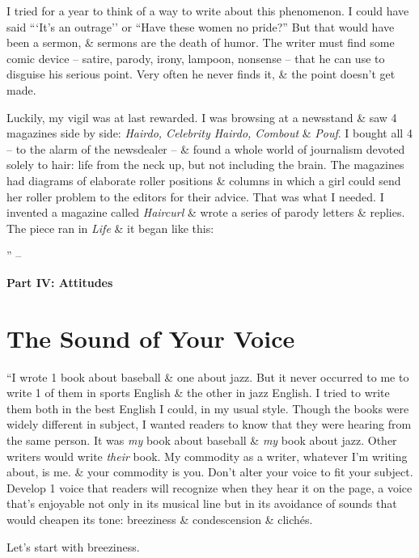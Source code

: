 \documentclass{article}
\numberwithin{equation}{section}
\begin{document}
I tried for a year to think of a way to write about this phenomenon. I could have said ```It's an outrage'' or ``Have these women no pride?'' But that would have been a sermon, \& sermons are the death of humor. The writer must find some comic device -- satire, parody, irony, lampoon, nonsense -- that he can use to disguise his serious point. Very often he never finds it, \& the point doesn't get made.

Luckily, my vigil was at last rewarded. I was browsing at a newsstand \& saw 4 magazines side by side: \textit{Hairdo, Celebrity Hairdo, Combout} \& \textit{Pouf}. I bought all 4 -- to the alarm of the newsdealer -- \& found a whole world of journalism devoted solely to hair: life from the neck up, but not including the brain. The magazines had diagrams of elaborate roller positions \& columns in which a girl could send her roller problem to the editors for their advice. That was what I needed. I invented a magazine called \textit{Haircurl} \& wrote a series of parody letters \& replies. The piece ran in \textit{Life} \& it began like this:

'' -- \cite[pp. 195--]{Zinsser2016}


\begin{center}\LARGE\sf
	\textbf{Part IV: Attitudes}
\end{center}

\section{The Sound of Your Voice}
``I wrote 1 book about baseball \& one about jazz. But it never occurred to me to write 1 of them in sports English \& the other in jazz English. I tried to write them both in the best English I could, in my usual style. Though the books were widely different in subject, I wanted readers to know that they were hearing from the same person. It was \textit{my} book about baseball \& \textit{my} book about jazz. Other writers would write \textit{their} book. My commodity as a writer, whatever I'm writing about, is me. \& your commodity is you. Don't alter your voice to fit your subject. Develop 1 voice that readers will recognize when they hear it on the page, a voice that's enjoyable not only in its musical line but in its avoidance of sounds that would cheapen its tone: breeziness \& condescension \& clich\'es.

Let's start with breeziness.
\end{document}
